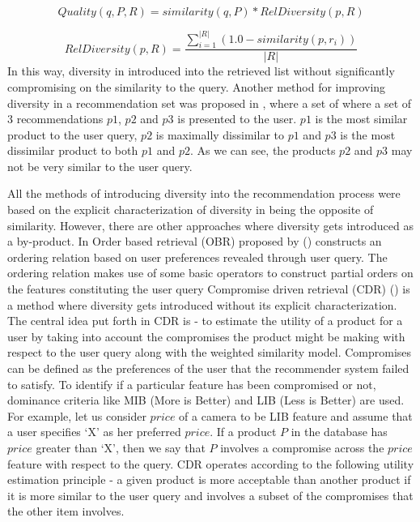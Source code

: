 \begin{equation}
\label{eq:quality}
Quality(q, P, R) = similarity(q, P) * RelDiversity(p, R)
\end{equation}

\begin{equation}
\label{eq:relDiversity}
RelDiversity(p, R)  = \frac{\sum_{i=1}^{\lvert R \rvert} (1.0 - similarity(p, r_i))} {\lvert R \rvert}
\end{equation}
In this way, diversity in introduced into the retrieved list without significantly compromising on the similarity to the query.
Another method for improving diversity in a recommendation set was proposed in \cite{expertclerk}, where a set of where a set of 3 recommendations $p1$, $p2$ and $p3$ is presented to the user. 
$p1$ is the most similar product to the user query, $p2$ is maximally dissimilar to $p1$ and $p3$ is the most dissimilar product to both $p1$ and $p2$. As we can see, the products $p2$ and $p3$ may not be very similar to the user query.

All the methods of introducing diversity into the recommendation process were based on the explicit characterization of diversity in being the opposite of similarity. 
However, there are other approaches where diversity gets introduced as a by-product. 
In Order based retrieval (OBR) proposed by (\cite{bridge02}) constructs an ordering relation based on user preferences revealed through user query.
The ordering relation makes use of some basic operators to construct partial orders on the features constituting the user query
Compromise driven retrieval (CDR) (\cite{mcsherry03}) is a method where diversity gets introduced without its explicit characterization. 
The central idea put forth in CDR is - to estimate the utility of a product for a user by taking into account the compromises the product might be making with respect to the user query along with the weighted similarity model.
Compromises can be defined as the preferences of the user that the recommender system failed to satisfy.
To identify if a particular feature has been compromised or not, dominance criteria like MIB (More is Better) and LIB (Less is Better) are used. 
For example, let us consider $price$ of a camera to be LIB feature and assume that a user specifies ‘X’ as her preferred $price$. 
If a product $P$ in the database has $price$ greater than ‘X’, then we say that $P$ involves a compromise across the $price$ feature with respect to the query.
CDR operates according to the following utility estimation principle - a given product is more acceptable than another product if it is more similar to the user query and involves a subset of the compromises that the other item involves.



